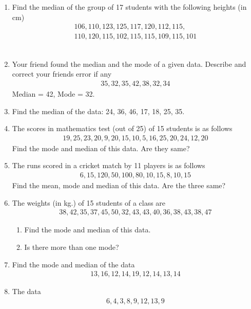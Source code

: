 \begin{enumerate}[label=\thesection.\arabic*, ref=\thesection.\theenumi,resume*]
	\item 
Find the median of
		the group of 17 students with the following heights (in cm)
\begin{gather*}
106, 110, 123, 125, 117, 120, 112, 115, 
\\
110, 120, 115, 102, 115, 115, 109, 115, 101
\end{gather*}
	\\
	\solution

\item Your friend found the median and the mode of a given data. Describe and correct your friends error if any
\begin{gather*}
	35, 32, 35, 42, 38, 32, 34 
\end{gather*}
Median = 42, Mode = 32.
\item Find the median of the data: 24, 36, 46, 17, 18, 25, 35.
\item The scores in mathematics test (out of 25) of 15 students is as follows
	\begin{gather*}
	19, 25, 23, 20, 9, 20, 15, 10, 5, 16, 25, 20, 24, 12, 20 
\end{gather*}
Find the mode and median of this data. Are they same?
\item The runs scored in a cricket match by 11 players is as follows 
	\begin{gather*}
	6, 15, 120, 50, 100, 80, 10, 15, 8, 10, 15
\end{gather*}
Find the mean, mode and median of this data. Are the three same?
\item The weights (in kg.) of 15 students of a class are
	\begin{gather*}
	38, 42, 35, 37, 45, 50, 32, 43, 43, 40, 36, 38, 43, 38, 47
\end{gather*}
\begin{enumerate}
	\item  Find the mode and median of this data. 
	\item Is there more than one mode?
\end{enumerate}
\item Find the mode and median of the data
	\begin{gather*}
	13, 16, 12, 14, 19, 12, 14, 13, 14
\end{gather*}
\item
	The data 
	\begin{gather*}
	6, 4, 3, 8, 9, 12, 13, 9 
\end{gather*}

\end{enumerate}
